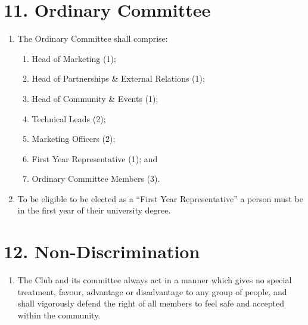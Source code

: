 \documentclass[12pt]{article}
\begin{document}
\section{11. Ordinary Committee}
\begin{enumerate}[label=11.\arabic*]
 \item The Ordinary Committee shall comprise:
    \begin{enumerate}[label=\theenumi.\arabic*]
        \item Head of Marketing (1);
        \item Head of Partnerships \& External Relations (1);
        \item Head of Community \& Events (1);
        \item Technical Leads (2);
        \item Marketing Officers (2);
        \item First Year Representative (1); and
        \item Ordinary Committee Members (3).
    \end{enumerate}
 \item To be eligible to be elected as a ``First Year Representative'' a person must be in the first year of their university degree.
\end{enumerate}

\section{12. Non-Discrimination}
\begin{enumerate}[label=12.\arabic*]
 \item The Club and its committee always act in a manner which gives no special treatment, favour, advantage or disadvantage to any group of people, and shall vigorously defend the right of all members to feel safe and accepted within the community.
\end{enumerate}
\end{document}
